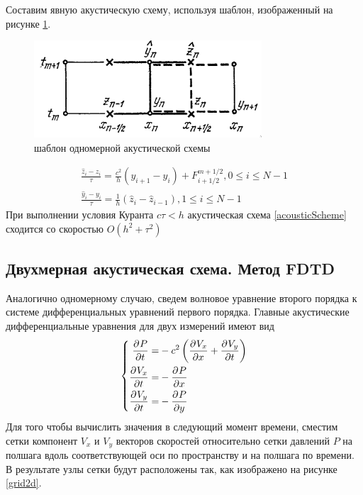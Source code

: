 \documentclass[a4paper, fontsize=14pt]{article}
\begin{document}
Составим явную акустическую схему, используя шаблон, изображенный на рисунке \ref{acousticTpl}.
\begin{figure}[h]
    \centering
    \includegraphics{scheme1d}
    \caption{шаблон одномерной акустической схемы}
    \label{acousticTpl}
\end{figure}
\begin{equation}
    \label{acousticScheme}
    \begin{gathered}
        \frac{\hat{z}_i - z_i}{\tau}=\frac{c^2}{h} (y_{i+1} - y_{i}) + F^{m+1/2}_{i+1/2}, 0\leq i\leq N-1\\
        \frac{\hat{y}_i - y_i}{\tau}=\frac{1}{h}(\hat{z}_i - \hat{z}_{i-1}), 1 \leq i \leq N-1
    \end{gathered}
\end{equation}
При выполнении условия Куранта $c\tau<h$ акустическая схема \ref{acousticScheme} сходится со
скоростью $O(h^2+\tau^2)$  \cite{kal}
\subsection{Двухмерная акустическая схема. Метод FDTD}
Аналогично одномерному случаю, сведем волновое уравнение второго порядка к системе дифференциальных уравнений
первого порядка.
Главные акустические дифференциальные уравнения для двух измерений имеют вид
\begin{equation}
	\left\{
	\begin{aligned}
		\label{acousticGov}
		\frac{\partial ^ {  } P}{\partial t ^ {  } } =& - c^2\left(\frac{\partial ^ {  } V_x}{\partial x ^ {  } }+\frac{\partial ^ {  } V_y}{\partial t ^ {  } }\right)\\
		\frac{\partial ^ {  } V_x}{\partial t ^ {  } } =& - \frac{\partial ^ {  } P}{\partial x ^ {  } }\\
		\frac{\partial ^ {  } V_y}{\partial t ^ {  } } =& - \frac{\partial ^ {  } P}{\partial y ^ {  } }
	\end{aligned}
	\right.
\end{equation}
Для того чтобы вычислить значения в следующий момент времени, сместим сетки компонент $V_x$ и $V_y$
векторов скоростей относительно сетки давлений $P$ на полшага вдоль соответствующей оси по пространству и на полшага
по времени\cite{ufdtd}. В результате узлы сетки будут расположены так, как изображено на рисунке \ref{grid2d}.
\end{document}
